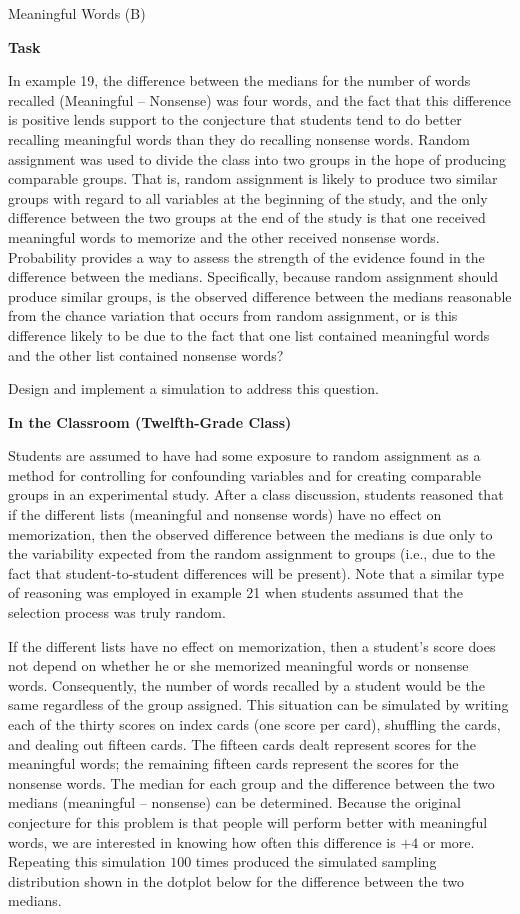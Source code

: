 \TriExample
  {
    Meaningful Words (B)
  }
  {
    \textbf{Task}

    In example 19, the difference between the medians for the number of words recalled (Meaningful -- Nonsense) was four words, and the fact that this difference is positive lends support to the conjecture that students tend to do better recalling meaningful words than they do recalling nonsense words. Random assignment was used to divide the class into two groups in the hope of producing comparable groups. That is, random assignment is likely to produce two similar groups with regard to all variables at the beginning of the study, and the only difference between the two groups at the end of the study is that one received meaningful words to memorize and the other received nonsense words. Probability provides a way to assess the strength of the evidence found in the difference between the medians. Specifically, because random assignment should produce similar groups, is the observed difference between the medians reasonable from the chance variation that occurs from random assignment, or is this difference likely to be due to the fact that one list contained meaningful words and the other list contained nonsense words? 

    Design and implement a simulation to address this question.

    \textbf{In the Classroom (Twelfth-Grade Class)}

    Students are assumed to have had some exposure to random assignment as a method for controlling for confounding variables and for creating comparable groups in an experimental study. After a class discussion, students reasoned that if the different lists (meaningful and nonsense words) have no effect on memorization, then the observed difference between the medians is due only to the variability expected from the random assignment to groups (i.e., due to the fact that student-to-student differences will be present). Note that a similar type of reasoning was employed in example 21 when students assumed that the selection process was truly random.

    If the different lists have no effect on memorization, then a student's score does not depend on whether he or she memorized meaningful words or nonsense words. Consequently, the number of words recalled by a student would be the same regardless of the group assigned. This situation can be simulated by writing each of the thirty scores on index cards (one score per card), shuffling the cards, and dealing out fifteen cards. The fifteen cards dealt represent scores for the meaningful words; the remaining fifteen cards represent the scores for the nonsense words. The median for each group and the difference between the two medians (meaningful -- nonsense) can be determined. Because the original conjecture for this problem is that people will perform better with meaningful words, we are interested in knowing how often this difference is $+4$ or more. Repeating this simulation $100$ times produced the simulated sampling distribution shown in the dotplot below for the difference between the two medians.

}
